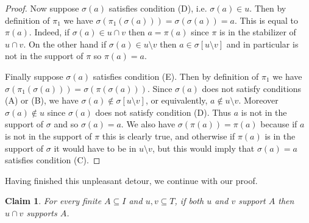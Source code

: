 \documentclass[12pt]{amsart}
\theoremstyle{plain}
\newtheorem{claim}{Claim}
\theoremstyle{definition}
\begin{document}
\begin{proof}
Now suppose $\sigma(a)$ satisfies condition (D), i.e. $\sigma(a) \in u$.
Then by definition of $\pi_1$ we have $\sigma(\pi_1(\sigma(a))) = \sigma(\sigma(a)) = a$.
This is equal to $\pi(a)$.
Indeed, if $\sigma(a) \in u \cap v$ then $a = \pi(a)$ since $\pi$ is in the stabilizer of $u \cap v$.
On the other hand if $\sigma(a) \in u \setminus v$ then $a \in \sigma[u \setminus v]$ and in particular is not in the support of $\pi$ so $\pi(a) = a$.

Finally suppose $\sigma(a)$ satisfies condition (E).
Then by definition of $\pi_1$ we have $\sigma(\pi_1(\sigma(a))) = \sigma(\pi(\sigma(a)))$.
Since $\sigma(a)$ does not satisfy conditions (A) or (B), we have $\sigma(a) \not \in \sigma[u \setminus v]$, or equivalently, $a \not\in u \setminus v$.
Moreover $\sigma(a) \not\in u$ since $\sigma(a)$ does not satisfy condition (D).
Thus $a$ is not in the support of $\sigma$ and so $\sigma(a) = a$.
We also have $\sigma(\pi(a)) = \pi(a)$ because if $a$ is not in the support of $\pi$ this is clearly true, and otherwise if $\pi(a)$ is in the support of $\sigma$ it would have to be in $u \setminus v$, but this would imply that $\sigma(a) = a$ satisfies condition (C).
\end{proof}

Having finished this unpleasant detour, we continue with our proof.

\begin{claim}
For every finite $A \subseteq I$ and $u, v \subseteq T$, if both $u$ and $v$ support $A$ then $u \cap v$ supports $A$.
\end{claim}
\end{document}
